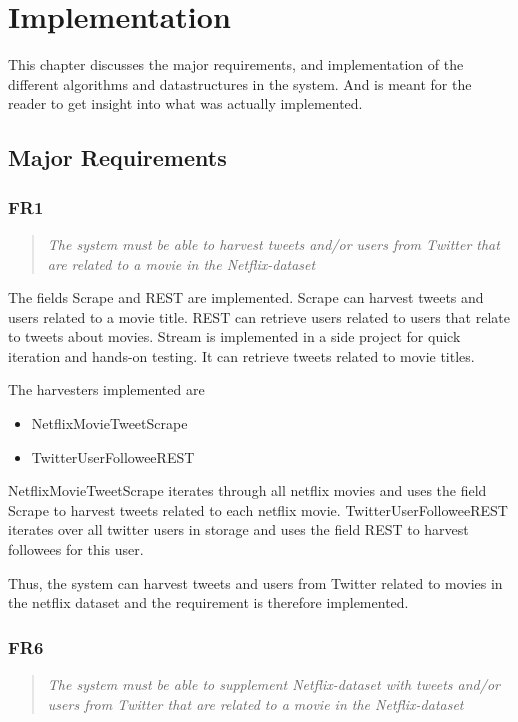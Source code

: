 
\chapter{Implementation}

\minitoc

This chapter discusses the major requirements, and implementation of the different algorithms and datastructures in the system. And is meant for the reader to get insight into what was actually implemented.

\clearpage

\section{Major Requirements}\label{impl:Major Requirements}
\subsection{FR1}
\begin{quotation}
\em The system must be able to harvest tweets and/or users from Twitter that are related to a movie in the Netflix-dataset %
\end{quotation}

The fields Scrape and REST are implemented. Scrape can harvest tweets and users related to a movie title. REST can retrieve users related to users that relate to tweets about movies. Stream is implemented in a side project for quick iteration and hands-on testing. It can retrieve tweets related to movie titles.

The harvesters implemented are
\begin{itemize}
\item NetflixMovieTweetScrape
\item TwitterUserFolloweeREST
\end{itemize}

NetflixMovieTweetScrape iterates through all netflix movies and uses the field Scrape to harvest tweets related to each netflix movie. TwitterUserFolloweeREST iterates over all twitter users in storage and uses the field REST to harvest followees for this user.

Thus, the system can harvest tweets and users from Twitter related to movies in the netflix dataset and the requirement is therefore implemented.

\subsection{FR6}\label{subsec:FR6}
\begin{quotation}
\em The system must be able to supplement Netflix-dataset with tweets and/or users from Twitter that are related to a movie in the Netflix-dataset %
\end{quotation}

